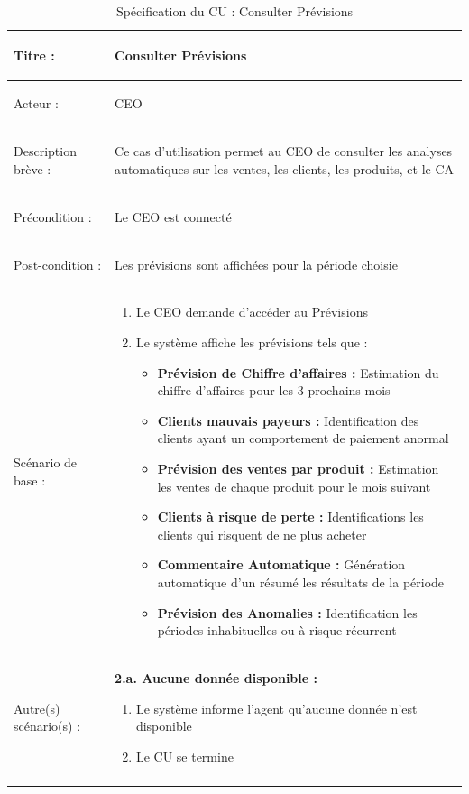\begin{longtable}{|>{\bfseries\raggedright\arraybackslash}p{3.5cm}|p{\dimexpr\textwidth-3.5cm-4\tabcolsep-2\arrayrulewidth}|}
\hline
Titre : & Consulter Prévisions \\
\hline
Acteur : & CEO \\
\hline
Description brève : & Ce cas d'utilisation permet au CEO de consulter les analyses automatiques sur les ventes, les clients, les produits, et le CA \\
\hline
Précondition : & Le CEO est connecté \\
\hline
Post-condition : & Les prévisions sont affichées pour la période choisie \\
\hline
Scénario de base : &
\begin{enumerate}[leftmargin=1.5em, topsep=2pt, itemsep=1pt]
  \item Le CEO demande d'accéder au Prévisions
  \item Le système affiche les prévisions tels que :
  \begin{itemize}[leftmargin=1.5em, topsep=2pt, itemsep=1pt]
    \item \textbf{Prévision de Chiffre d'affaires :} Estimation du chiffre d'affaires pour les 3 prochains mois
    \item \textbf{Clients mauvais payeurs :} Identification des clients ayant un comportement de paiement anormal
    \item \textbf{Prévision des ventes par produit :} Estimation les ventes de chaque produit pour le mois suivant
    \item \textbf{Clients à risque de perte :} Identifications les clients qui risquent de ne plus acheter
    \item \textbf{Commentaire Automatique :} Génération automatique d'un résumé les résultats de la période
    \item \textbf{Prévision des Anomalies :} Identification les périodes inhabituelles ou à risque récurrent
  \end{itemize}
\end{enumerate} \\
\hline
Autre(s) scénario(s) : &
\textbf{2.a. Aucune donnée disponible :}
\begin{enumerate}[leftmargin=1.5em, topsep=2pt, itemsep=1pt]
  \item Le système informe l'agent qu'aucune donnée n'est disponible
  \item Le CU se termine
\end{enumerate} \\
\hline
\caption{Spécification du CU : Consulter Prévisions}
\label{tab:cu-consulter-previsions}
\end{longtable}

